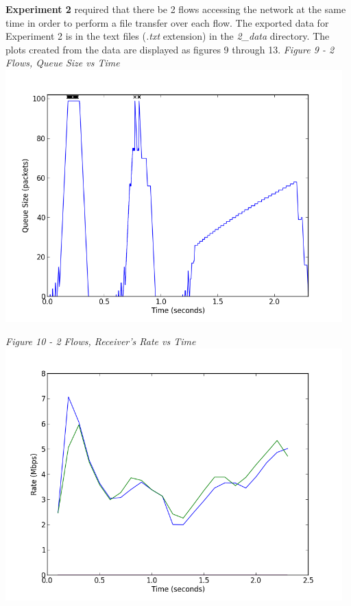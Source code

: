\documentclass[11pt]{article}
\begin{document}
\textbf{Experiment 2} required that there be 2 flows accessing the network at the same time in order to perform a file transfer over each flow. The exported data for Experiment 2 is in the text files (\textit{.txt} extension) in the \textit{2\_data} directory. The plots created from the data are displayed as figures 9 through 13.
\vspace{0.25cm}
\textit{Figure 9 - 2 Flows, Queue Size vs Time}
\\
\includegraphics[width=13cm]{2_data/2-queue}
\vspace{0.25cm}

\textit{Figure 10 - 2 Flows, Receiver's Rate vs Time}
\\
\includegraphics[width=13cm]{2_data/2-rate}
\vspace{0.25cm}
\end{document}
